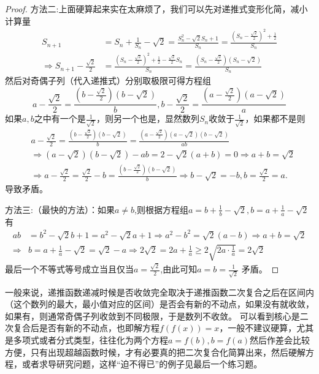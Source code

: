 \documentclass[../../main.tex]{subfiles}
\begin{document}
\begin{proof}
{\color{blue}方法二:}上面硬算起来实在太麻烦了，我们可以先对递推式变形化简，减小计算量
\begin{align*}
S_{n + 1}&=S_n+\frac{1}{S_n}-\sqrt{2}=\frac{S_n^2-\sqrt{2}S_n + 1}{S_n}=\frac{\left(S_n-\frac{\sqrt{2}}{2}\right)^2+\frac{1}{2}}{S_n}\\
\Rightarrow S_{n + 1}-\frac{\sqrt{2}}{2}&=\frac{\left(S_n-\frac{\sqrt{2}}{2}\right)^2+\frac{1}{2}-\frac{\sqrt{2}}{2}S_n}{S_n}=\frac{\left(S_n-\frac{\sqrt{2}}{2}\right)(S_n-\sqrt{2})}{S_n}
\end{align*}
然后对奇偶子列（代入递推式）分别取极限可得方程组
\[a-\frac{\sqrt{2}}{2}=\frac{\left(b-\frac{\sqrt{2}}{2}\right)(b - \sqrt{2})}{b},b-\frac{\sqrt{2}}{2}=\frac{\left(a-\frac{\sqrt{2}}{2}\right)(a - \sqrt{2})}{a}\]
如果\(a,b\)之中有一个是\(\frac{1}{\sqrt{2}}\)，则另一个也是，显然数列\(S_n\)收敛于\(\frac{1}{\sqrt{2}}\)，如果都不是则
\begin{align*}
&a-\frac{\sqrt{2}}{2}=\frac{\left( b-\frac{\sqrt{2}}{2} \right) (b-\sqrt{2})}{b}=\frac{\left( a-\frac{\sqrt{2}}{2} \right) (a-\sqrt{2})(b-\sqrt{2})}{ab}
\\
&\Rightarrow \left( a-\sqrt{2} \right) \left( b-\sqrt{2} \right) -ab=2-\sqrt{2}(a+b)=0\Rightarrow a+b=\sqrt{2}
\\
&\Rightarrow a-\frac{\sqrt{2}}{2}=\frac{\sqrt{2}}{2}-b=\frac{\left( b-\frac{\sqrt{2}}{2} \right) (b-\sqrt{2})}{b}\Rightarrow b-\sqrt{2}=-b,b=\frac{\sqrt{2}}{2}=a.
\end{align*}
导致矛盾。

{\color{blue}方法三:}（最快的方法）：如果\(a\neq b\),则根据方程组\(a = b+\frac{1}{b}-\sqrt{2},b = a+\frac{1}{a}-\sqrt{2}\)有
\begin{align*}
ab&=b^2-\sqrt{2}b+1=a^2-\sqrt{2}a+1\Rightarrow a^2-b^2=\sqrt{2}\left( a-b \right) \Rightarrow a+b=\sqrt{2}\\
\Rightarrow &b=a+\frac{1}{a}-\sqrt{2}=\sqrt{2}-a\Rightarrow 2\sqrt{2}=2a+\frac{1}{a}\geq2\sqrt{2a\cdot\frac{1}{a}}=2\sqrt{2}
\end{align*}
最后一个不等式等号成立当且仅当$a=\frac{\sqrt{2}}{2}$,由此可知\(a = b=\frac{1}{\sqrt{2}}\) 矛盾。
\end{proof}
\begin{remark}
一般来说，递推函数递减时候是否收敛完全取决于递推函数二次复合之后在区间内（这个数列的最大，最小值对应的区间）是否会有新的不动点，如果没有就收敛，如果有，则通常奇偶子列收敛到不同极限，于是数列不收敛。
可以看到核心是二次复合后是否有新的不动点，也即解方程\(f(f(x)) = x\)，一般不建议硬算，尤其是多项式或者分式类型，往往化为两个方程\(a = f(b),b = f(a)\)然后作差会比较方便，只有出现超越函数时候，才有必要真的把二次复合化简算出来，然后硬解方程，或者求导研究问题，这样“迫不得已”的例子见最后一个练习题。
\end{remark}
\end{document}
